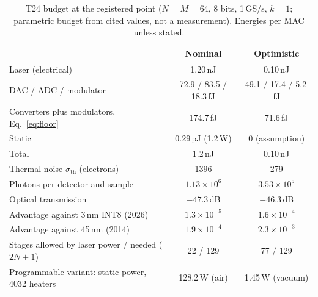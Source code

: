 \documentclass[11pt,a4paper]{article}
\newcommand{\dB}{\,dB\xspace}
\newcommand{\fJ}{\,fJ\xspace}
\begin{document}
\begin{table}[t]
\centering\small
\caption{T24 budget at the registered point ($N=M=64$, 8 bits, 1\,GS/s, $k=1$; parametric budget from cited values, not a measurement). Energies per MAC unless stated.}
\label{tab:t24}
\begin{tabular}{@{}>{\raggedright\arraybackslash}p{6.2cm}cc@{}}
\toprule
 & Nominal & Optimistic \\
\midrule
Laser (electrical) & 1.20\,nJ & 0.10\,nJ \\
DAC / ADC / modulator & 72.9 / 83.5 / 18.3\fJ & 49.1 / 17.4 / 5.2\fJ \\
Converters plus modulators, Eq.~\eqref{eq:floor} & 174.7\fJ & 71.6\fJ \\
Static & 0.29\,pJ (1.2\,W) & 0 (assumption) \\
Total & 1.2\,nJ & 0.10\,nJ \\
Thermal noise $\sigma_\mathrm{th}$ (electrons) & 1396 & 279 \\
Photons per detector and sample & $1.13\times10^{6}$ & $3.53\times10^{5}$ \\
Optical transmission & $-47.3$\dB & $-46.3$\dB \\
Advantage against 3\,nm INT8 (2026) & $1.3\times10^{-5}$ & $1.6\times10^{-4}$ \\
Advantage against 45\,nm (2014) & $1.9\times10^{-4}$ & $2.3\times10^{-3}$ \\
Stages allowed by laser power / needed ($2N+1$) & 22 / 129 & 77 / 129 \\
Programmable variant: static power, 4032 heaters & 128.2\,W (air) & 1.45\,W (vacuum) \\
\bottomrule
\end{tabular}
\end{table}
\end{document}
